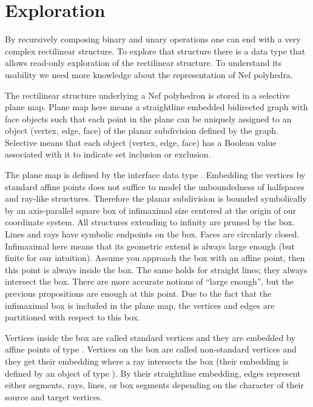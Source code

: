 \section{Exploration}

By recursively composing binary and unary operations one can end with
a very complex rectilinear structure. To explore that structure there
is a data type  that allows
read-only exploration of the rectilinear structure. To understand its
usability we need more knowledge about the representation of Nef
polyhedra.

The rectilinear structure underlying a Nef polyhedron is stored in a
selective plane map. Plane map here means a straightline embedded
bidirected graph with face objects such that each point in the plane
can be uniquely assigned to an object (vertex, edge, face) of the
planar subdivision defined by the graph. Selective means that each
object (vertex, edge, face) has a Boolean value associated with it to
indicate set inclusion or exclusion.

The plane map is defined by the interface data type
. Embedding the vertices by
standard affine points does not suffice to model the unboundedness of
halfspaces and ray-like structures. Therefore the planar subdivision
is bounded symbolically by an axis-parallel square box of infimaximal
size centered at the origin of our coordinate system. All structures
extending to infinity are pruned by the box. Lines and rays have
symbolic endpoints on the box. Faces are circularly closed.
Infimaximal here means that its geometric extend is always large
enough (but finite for our intuition). Assume you approach the box
with an affine point, then this point is always inside the box. The
same holds for straight lines; they always intersect the box. There
are more accurate notions of ``large enough'', but the previous
propositions are enough at this point. Due to the fact that the
infimaximal box is included in the plane map, the vertices and edges
are partitioned with respect to this box.

Vertices inside the box are called standard vertices and they are
embedded by affine points of type . Vertices on
the box are called non-standard vertices and they get their embedding
where a ray intersects the box (their embedding is defined by an
object of type ). By their straightline embedding,
edges represent either segments, rays, lines, or box segments
depending on the character of their source and target vertices.

